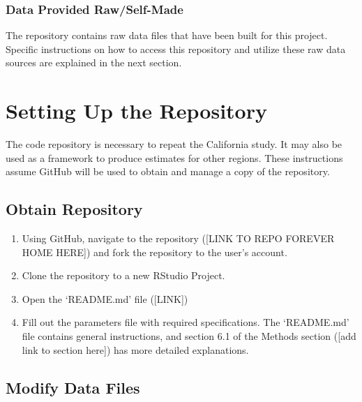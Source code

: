 \documentclass[
]{book}
\providecommand{\tightlist}{%
  \setlength{\itemsep}{0pt}\setlength{\parskip}{0pt}}
\begin{document}
\hypertarget{provided}{%
\subsection{Data Provided Raw/Self-Made}\label{provided}}

The repository contains raw data files that have been built for this project. Specific instructions on how to access this repository and utilize these raw data sources are explained in the next section.

\hypertarget{setup}{%
\chapter{Setting Up the Repository}\label{setup}}

The code repository is necessary to repeat the California study. It may also be used as a framework to produce estimates for other regions. These instructions assume GitHub will be used to obtain and manage a copy of the repository.

\hypertarget{get-repo}{%
\section{Obtain Repository}\label{get-repo}}

\begin{enumerate}
\def\labelenumi{\arabic{enumi}.}
\tightlist
\item
  Using GitHub, navigate to the repository ({[}LINK TO REPO FOREVER HOME HERE{]}) and fork the repository to the user's account.
\item
  Clone the repository to a new RStudio Project.
\item
  Open the `README.md' file ({[}LINK{]})
\item
  Fill out the parameters file with required specifications. The `README.md' file contains general instructions, and section 6.1 of the Methods section ({[}add link to section here{]}) has more detailed explanations.
\end{enumerate}

\hypertarget{modify-data}{%
\section{Modify Data Files}\label{modify-data}}
\end{document}
